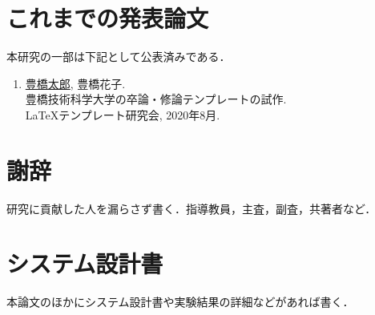 \documentclass[a4paper,11ptj,dvipdfmx]{jsreport} %
\begin{document}
\chapter*{これまでの発表論文}

本研究の一部は下記として公表済みである．

\begin{enumerate}
\item 
\uline{豊橋太郎}, 豊橋花子.\\
豊橋技術科学大学の卒論・修論テンプレートの試作.\\
LaTeXテンプレート研究会, 2020年8月.
\end{enumerate}


\chapter*{謝辞}
研究に貢献した人を漏らさず書く．指導教員，主査，副査，共著者など．


\appendix
\chapter{システム設計書}
本論文のほかにシステム設計書や実験結果の詳細などがあれば書く．
\end{document}
